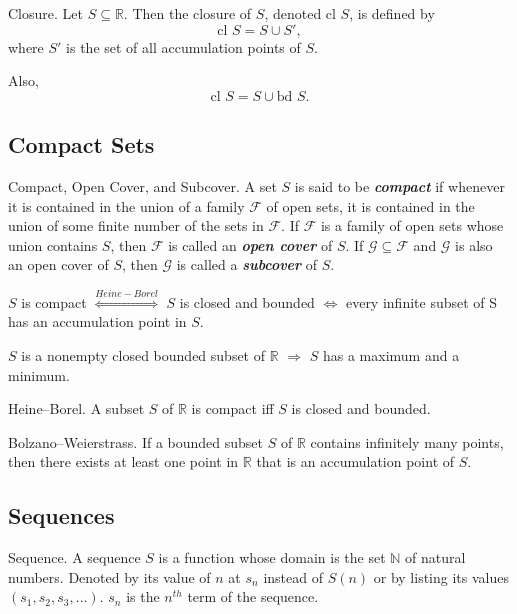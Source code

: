 \documentclass[12pt]{article}
\newcommand\Real{\mathbb{R}}
\newcommand\Natural{\mathbb{N}}
\newcommand\sube{\subseteq}
\newcommand\pr{\ensuremath{'}}
\newcommand\F{\mathscr{F}}
\newcommand\G{\mathscr{G}}
\begin{document}
\begin{definition}{Closure.}
  Let $S \sube \Real$. Then the closure of $S$, denoted $\text{cl } S$, is
  defined by $$\text{cl } S = S \cup S\pr,$$ where $S\pr$ is the set of all
  accumulation points of $S$.

  Also, $$\text{cl } S = S \cup \text{bd } S.$$
\end{definition}

\subsection{Compact Sets}
\label{sec:org6a65270}
\begin{definition}{Compact, Open Cover, and Subcover.}
  A set $S$ is said to be \textit{\textbf{compact}} if whenever it is
  contained in the union of a family $\F$ of open sets, it is contained in
  the union of some finite number of the sets in $\F$. If $\F$ is a family of
  open sets whose union contains $S$, then $\F$ is called an
  \textit{\textbf{open cover}} of $S$. If $\G \sube \F$ and $\G$ is also an open
  cover of $S$, then $\G$ is called a \textit{\textbf{subcover}} of $S$.

  \begin{corollary}{}
      $S$ is compact $\overset{Heine-Borel}{\iff}$ $S$ is closed and bounded
      $\iff$ every infinite subset of S has an accumulation point in $S$.

      $S$ is a nonempty closed bounded subset of $\Real$ $\Rightarrow$ $S$ has a maximum
      and a minimum.
  \end{corollary}
\end{definition}

\begin{definition}{Heine--Borel.}
  A subset $S$ of $\Real$ is compact iff $S$ is closed and bounded.
\end{definition}

\begin{definition}{Bolzano--Weierstrass.}
  If a bounded subset $S$ of $\Real$ contains infinitely many points, then there
  exists at least one point in $\Real$ that is an accumulation point of $S$.
\end{definition}

\subsection{Sequences}
\label{sec:org2138fae}
\begin{definition}{Sequence.}
  A sequence $S$ is a function whose domain is the set $\Natural$ of natural
  numbers. Denoted by its value of $n$ at $s_n$ instead of $S(n)$ or by listing
  its values $(s_1, s_2, s_3, ...)$. $s_n$ is the $n^{th}$ term of the sequence.
\end{definition}
\end{document}
